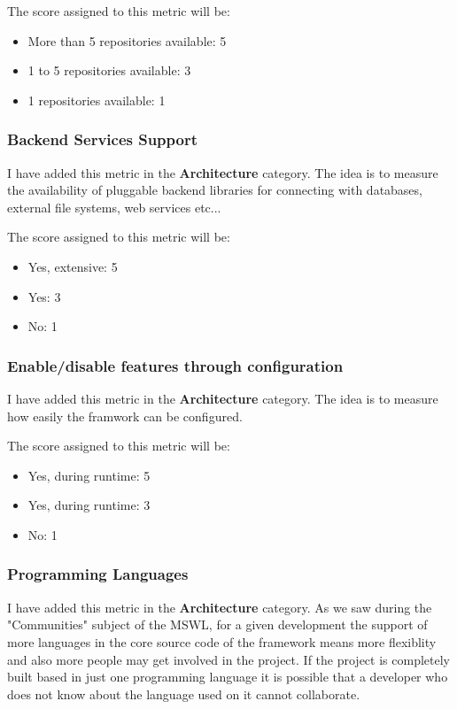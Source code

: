 \documentclass[a4paper,12pt]{book}
\begin{document}
The score assigned to this metric will be:
\begin{itemize}
 \item More than 5 repositories available: 5
 \item 1 to 5 repositories available: 3
 \item 1 repositories available: 1
\end{itemize}

\subsubsection{Backend Services Support}
\label{Backend Services Support}

I have added this metric in the \textbf{Architecture} category. The idea is to measure the availability of pluggable backend libraries for connecting with databases, external file systems, web services etc...

The score assigned to this metric will be:
\begin{itemize}
 \item Yes, extensive: 5
 \item Yes: 3
 \item No: 1
\end{itemize}

\subsubsection{Enable/disable features through configuration}
\label{Enable/disable features through configuration}

I have added this metric in the \textbf{Architecture} category. The idea is to measure how easily the framwork can be configured.

The score assigned to this metric will be:
\begin{itemize}
 \item Yes, during runtime: 5
 \item Yes, during runtime: 3
 \item No: 1
\end{itemize}

\subsubsection{Programming Languages}
\label{Programming Languages}

I have added this metric in the \textbf{Architecture} category. As we saw during the "Communities" subject of the MSWL, for a given development the support of more languages in the core source code of the framework means more flexiblity and also more people may get involved in the project. If the project is completely built based in just one programming language it is possible that a developer who does not know about the language used on it cannot collaborate.
\end{document}
